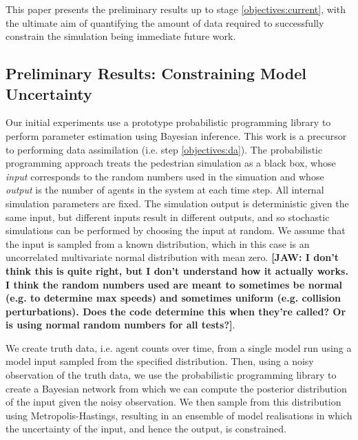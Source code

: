 \documentclass[runningheads]{llncs}
\begin{document}
This paper presents the preliminary results up to stage \ref{objectives:current}, with the ultimate aim of quantifying the amount of data required to successfully constrain the simulation being immediate future work. 


\subsection{Preliminary Results: Constraining Model Uncertainty}

Our initial experiments use a prototype probabilistic programming library to perform parameter estimation using Bayesian inference. This work is a precursor to performing data assimilation (i.e. step \ref{objectives:da}). The probabilistic programming approach treats the pedestrian simulation as a black box, whose \emph{input} corresponds to the random numbers used in the simuation and whose \emph{output} is the number of agents in the system at each time step. All internal simulation parameters are fixed. The simulation output is deterministic given the same input, but different inputs result in different outputs, and so stochastic simulations can be performed by choosing the input at random. We assume that the input is sampled from a known distribution, which in this case is an uncorrelated multivariate normal distribution with mean zero. {\bf [JAW: I don't think this is quite right, but I don't understand how it actually works. I think the random numbers used are meant to sometimes be normal (e.g. to determine max speeds) and sometimes uniform (e.g. collision perturbations). Does the code determine this when they're called? Or is using normal random numbers for all tests?]}. 

We create truth data, i.e. agent counts over time, from a single model run using a model input sampled from the specified distribution. Then, using a noisy observation of the truth data, we use the probabilistic programming library to create a Bayesian network from which we can compute the posterior distribution of the input given the noisy observation. We then sample from this distribution using Metropolis-Hastings, resulting in an ensemble of model realisations in which the uncertainty of the input, and hence the output, is constrained.

\end{document}
